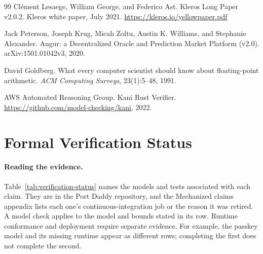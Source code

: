 \documentclass[11pt,a4paper]{article}
\theoremstyle{definition}
\theoremstyle{remark}
\begin{document}
\begin{thebibliography}{99}
Cl\'ement Lesaege, William George, and Federico Ast.
\newblock Kleros Long Paper v2.0.2.
\newblock Kleros white paper, July 2021.
\newblock \url{https://kleros.io/yellowpaper.pdf}

Jack Peterson, Joseph Krug, Micah Zoltu, Austin K. Williams, and Stephanie Alexander.
\newblock Augur: a Decentralized Oracle and Prediction Market Platform (v2.0).
\newblock arXiv:1501.01042v3, 2020.

David Goldberg.
\newblock What every computer scientist should know about floating-point arithmetic.
\newblock \textit{ACM Computing Surveys}, 23(1):5--48, 1991.

AWS Automated Reasoning Group.
\newblock Kani Rust Verifier.
\newblock \url{https://github.com/model-checking/kani}, 2022.

\end{thebibliography}

\appendix

\section{Formal Verification Status}\label{app:mech}

\paragraph{Reading the evidence.} Table~\ref{tab:verification-status} names the
models and tests associated with each claim. They are in the Port Daddy
repository, and the Mechanized claims appendix lists each one's continuous-integration
job or the reason it was retired. A model check applies to
the model and bounds stated in its row. Runtime conformance and deployment
require separate evidence. For example, the passkey model and its missing
runtime appear as different rows; completing the first does not complete the second.
\end{document}

